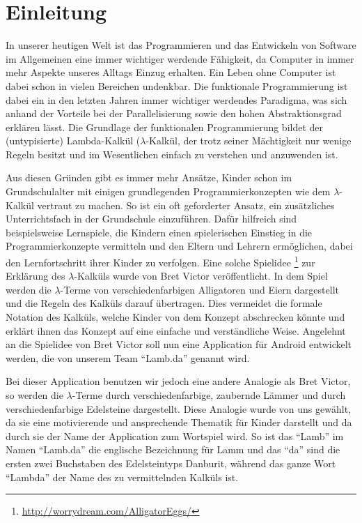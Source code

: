 \section{Einleitung}

In unserer heutigen Welt ist das Programmieren und das Entwickeln von Software im Allgemeinen eine immer wichtiger werdende Fähigkeit, da Computer in immer mehr Aspekte unseres Alltags Einzug erhalten. Ein Leben ohne Computer ist dabei schon in vielen Bereichen undenkbar. \newline 
Die funktionale Programmierung ist dabei ein in den letzten Jahren immer wichtiger werdendes Paradigma, was sich anhand der Vorteile bei der Parallelisierung sowie den hohen  Abstraktionsgrad erklären lässt. Die Grundlage der funktionalen Programmierung bildet der (untypisierte) Lambda-Kalkül ($\lambda$-Kalkül, der trotz seiner Mächtigkeit nur wenige Regeln besitzt und im Wesentlichen einfach zu verstehen und anzuwenden ist.

Aus diesen Gründen gibt es immer mehr Ansätze, Kinder schon im Grundschulalter mit einigen grundlegenden Programmierkonzepten wie dem $\lambda$-Kalkül vertraut zu machen.  So ist ein oft geforderter Ansatz, ein zusätzliches Unterrichtsfach in der Grundschule einzuführen. Dafür hilfreich sind beispielsweise Lernspiele, die Kindern einen spielerischen Einstieg in die Programmierkonzepte vermitteln und den Eltern und Lehrern ermöglichen, dabei den Lernfortschritt ihrer Kinder zu verfolgen.\newline
Eine solche Spielidee \footnote{\url{http://worrydream.com/AlligatorEggs/}} zur Erklärung des $\lambda$-Kalküls wurde von Bret Victor veröffentlicht. In dem Spiel werden die $\lambda$-Terme von verschiedenfarbigen Alligatoren und Eiern dargestellt und die Regeln des Kalküls darauf übertragen. Dies vermeidet die formale Notation des Kalküls, welche Kinder von dem Konzept abschrecken könnte und erklärt ihnen das Konzept auf eine einfache und verständliche Weise. Angelehnt an die Spielidee von Bret Victor soll nun eine Application für Android entwickelt werden, die von unserem Team "`Lamb.da"' genannt wird. 

Bei dieser Application benutzen wir jedoch eine andere Analogie als Bret Victor, so werden die $\lambda$-Terme durch verschiedenfarbige, zaubernde Lämmer und durch verschiedenfarbige Edelsteine dargestellt. Diese Analogie wurde von uns gewählt, da sie eine motivierende und ansprechende Thematik für Kinder darstellt und da durch sie der Name der Application zum Wortspiel wird. So ist das "`Lamb"' im Namen "`Lamb.da"' die englische Bezeichnung für Lamm und das "`da"' sind die ersten zwei Buchstaben des Edelsteintyps Danburit, während das ganze Wort "`Lambda"' der Name des zu vermittelnden Kalküls ist. 


